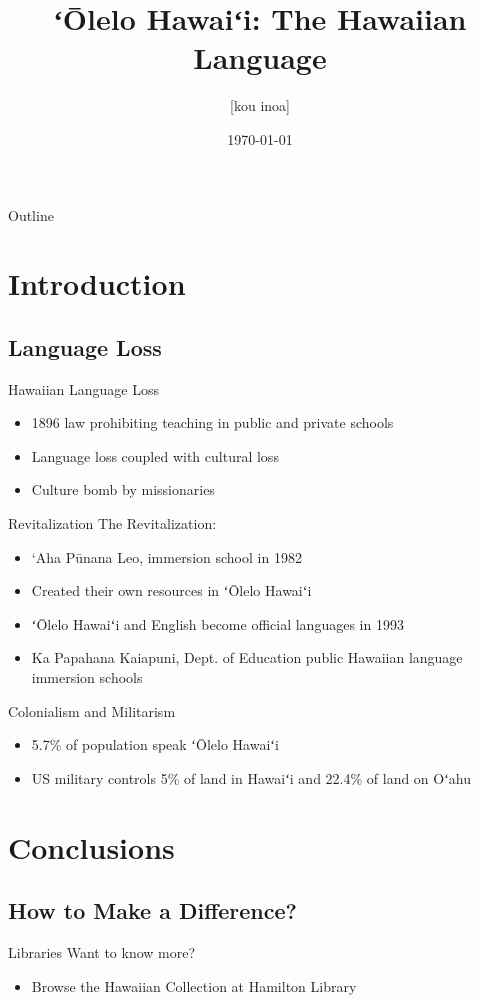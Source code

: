 \documentclass{beamer}
\title{ʻŌlelo Hawaiʻi: The Hawaiian Language}
\author{[kou inoa]}
\date{\today}
\begin{document}

\frame{\titlepage}

\section[Outline]{}
\begin{frame}{Outline}
  \tableofcontents
\end{frame}

\section{Introduction}
\subsection{Language Loss}
\begin{frame}{Hawaiian Language Loss}
  \begin{itemize}
    \item 1896 law prohibiting teaching in public and private schools
    \item Language loss coupled with cultural loss
    \item Culture bomb by missionaries
  \end{itemize}
\end{frame}
\begin{frame}{Revitalization}
  The Revitalization:
  \pause
  \begin{itemize}
    \item<2-> ‘Aha Pūnana Leo, immersion school in 1982
    \item<3-> Created their own resources in ʻŌlelo Hawaiʻi
    \item<4-> ʻŌlelo Hawaiʻi and English become official languages in 1993
    \item<5-> Ka Papahana Kaiapuni, Dept. of Education public Hawaiian language immersion schools
  \end{itemize}
\end{frame}
\begin{frame}{Colonialism and Militarism}
  \begin{itemize}
    \item<1-> 5.7\% of population speak ʻŌlelo Hawaiʻi 
    \item<2-> US military controls 5\% of land in Hawaiʻi and 22.4\% of land on Oʻahu
  \end{itemize}
\end{frame}
\section{Conclusions}
\subsection{How to Make a Difference?}
\begin{frame}{Libraries}
  Want to know more?

  \begin{itemize}
    \item Browse the Hawaiian Collection at Hamilton Library
  \end{itemize}
  
\end{frame}
\end{document}
